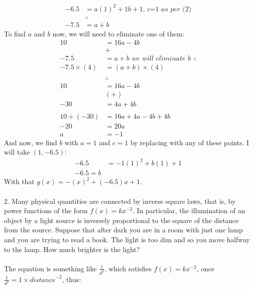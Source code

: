 \documentclass{article}
\begin{document}
\begin{equation}
\begin{split}
    -6.5 & = a(1)^2 + 1b + 1 \textit{, c=1 as per (2)}\\
    & \therefore\\
    -7.5 & = a + b
\end{split}
\end{equation}
To find $a$ and $b$ now, we will need to eliminate one of them:
\begin{equation}
\begin{split}
    10 & = 16a - 4b\\
    & + \\
    -7.5 & = a + b \textit{ we will eliminate b $\therefore$}\\
    -7.5\times(4) & = (a + b)\times(4)\\\\
    & \therefore\\
    10 & = 16a - 4b\\
    & (+)\\
    - 30 & = 4a + 4b\\\\
    10 + (-30) & = 16a + 4a - 4b + 4b\\
    -20 & = 20a\\
    a & = -1
\end{split}
\end{equation}
And now, we find $b$ with $a=1$ and $c=1$ by replacing with any of these points. I will take $(1, -6.5)$:
\begin{equation}
\begin{split}
	-6.5 & = -1(1)^2 + b(1) + 1\\
	-6.5 = b
\end{split}
\end{equation}
With that $g(x) = -(x)^2 + (-6.5)x + 1$.
\\\\
2. Many physical quantities are connected by inverse square laws, that is, by power functions of the form 
$f(x) = kx^{-2}$.
 In particular, the illumination of an object by a light source is inversely proportional to the square of the distance from the source. Suppose that after dark you are in a room with just one lamp and you are trying to read a book. The light is too dim and so you move halfway to the lamp. How much brighter is the light?\\\\
The equation is something like $\frac{1}{d^2}$, which satisfies $f(x) = kx^{-2}$, once $\frac{1}{d^2} = 1\times\textit{distance}^{-2}$, thus:\\\\
\end{document}
